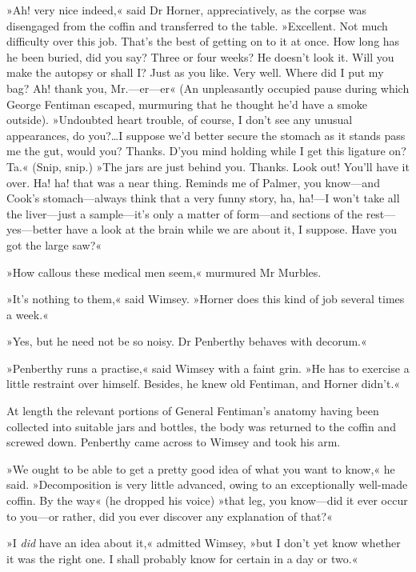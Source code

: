 »Ah! very nice indeed,« said Dr Horner, appreciatively, as the corpse was disengaged from the coffin and transferred to the table. »Excellent. Not much difficulty over this job. That's the best of getting on to it at once. How long has he been buried, did you say? Three or four weeks? He doesn't look it. Will you make the autopsy or shall I? Just as you like. Very well. Where did I put my bag? Ah! thank you, Mr.—er—er\longdash« (An unpleasantly occupied pause during which George Fentiman escaped, murmuring that he thought he'd have a smoke outside). »Undoubted heart trouble, of course, I don't see any unusual appearances, do you?\dots I suppose we'd better secure the stomach as it stands \textellipsis  pass me the gut, would you? Thanks. D'you mind holding while I get this ligature on? Ta.« (Snip, snip.) »The jars are just behind you. Thanks. Look out! You'll have it over. Ha! ha! that was a near thing. Reminds me of Palmer, you know—and Cook's stomach—always think that a very funny story, ha, ha!—I won't take all the liver—just a sample—it's only a matter of form—and sections of the rest—yes—better have a look at the brain while we are about it, I suppose. Have you got the large saw?«

»How callous these medical men seem,« murmured Mr Murbles.

»It's nothing to them,« said Wimsey. »Horner does this kind of job several times a week.«

»Yes, but he need not be so noisy. Dr Penberthy behaves with decorum.«

»Penberthy runs a practise,« said Wimsey with a faint grin. »He has to exercise a little restraint over himself. Besides, he knew old Fentiman, and Horner didn't.«

At length the relevant portions of General Fentiman's anatomy having been collected into suitable jars and bottles, the body was returned to the coffin and screwed down. Penberthy came across to Wimsey and took his arm.

»We ought to be able to get a pretty good idea of what you want to know,« he said. »Decomposition is very little advanced, owing to an exceptionally well-made coffin. By the way« (he dropped his voice) »that leg, you know—did it ever occur to you—or rather, did you ever discover any explanation of that?«

»I \textit{did} have an idea about it,« admitted Wimsey, »but I don't yet know whether it was the right one. I shall probably know for certain in a day or two.«

